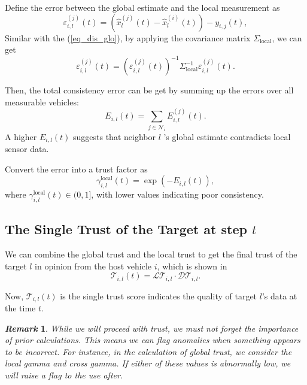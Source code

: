 \documentclass[letterpaper, 10pt, conference]{ieeeconf}  %
\def\eqref#1{(\ref{#1})}
\def\N{\mathcal{N}} %
\def\LT{\mathcal{LT}} %
\def\DT{\mathcal{DT}} %
\def\T{\mathcal{T}} %
\newtheorem{remark}{\it Remark}%
\begin{document}
Define the error between the global estimate and the local measurement as
\begin{equation}
    \varepsilon_{i,l}^{(j)}(t) = \left( \hat{x}_l^{(j)}(t) - \hat{x}_l^{(i)}(t) \right) - y_{i,j}(t), 
\end{equation}
Similar with the \eqref{eq_dis_glo}, by applying the covariance matrix $\Sigma_{\text{local}}$, we can get 
\begin{equation}
    \varepsilon_{i,l}^{(j)}(t) = (\varepsilon_{i,l}^{(j)}(t))^{-1} \Sigma_{\text{local}}^{-1} \varepsilon_{i,l}^{(j)}(t).
\end{equation}

Then, the total consistency error can be get by summing up the errors over all measurable vehicles:
\begin{equation} 
    E_{i,l}(t) = \sum_{j \in \N_i} E_{i,l}^{(j)}(t).
\end{equation}
A higher $E_{i,l}(t)$  suggests that neighbor  $l$ 's global estimate contradicts local sensor data.

Convert the error into a trust factor as
\begin{equation}
    \gamma_{i,l}^{\text{local}}(t) = \exp\left( -{E_{i,l}(t)} \right),
\end{equation}
where $\gamma_{i,l}^{\text{local}}(t) \in (0, 1]$, with lower values indicating poor consistency. 


\subsection{The Single Trust of the Target at step $t$}  
We can combine the global trust and the local trust to get the final trust of the target $l$ in opinion from the host vehicle $i$, which is shown in 
\begin{equation}
    \T_{i,l}(t) =  \LT_{i,l} \cdot \DT_{i,l}. 
    \label{trs_sample_genral}
\end{equation}

Now, $\T_{i,l}(t)$ is the single trust score indicates the quality of target $l$'s data at the time $t$.

\begin{remark}
    While we will proceed with trust, we must not forget the importance of prior calculations. This means we can flag anomalies when something appears to be incorrect. For instance, in the calculation of global trust, we consider the local gamma and cross gamma. 
    If either of these values is abnormally low, we will raise a flag to the use after.
\end{remark}
\end{document}
